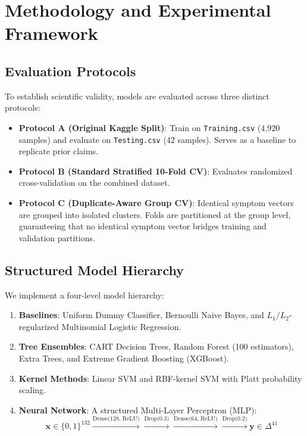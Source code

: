 \section{Methodology and Experimental Framework}
\label{sec:methodology}

\subsection{Evaluation Protocols}
To establish scientific validity, models are evaluated across three distinct protocols:
\begin{itemize}
    \item \textbf{Protocol A (Original Kaggle Split)}: Train on \texttt{Training.csv} (4,920 samples) and evaluate on \texttt{Testing.csv} (42 samples). Serves as a baseline to replicate prior claims.
    \item \textbf{Protocol B (Standard Stratified 10-Fold CV)}: Evaluates randomized cross-validation on the combined dataset.
    \item \textbf{Protocol C (Duplicate-Aware Group CV)}: Identical symptom vectors are grouped into isolated clusters. Folds are partitioned at the group level, guaranteeing that no identical symptom vector bridges training and validation partitions.
\end{itemize}

\subsection{Structured Model Hierarchy}
We implement a four-level model hierarchy:
\begin{enumerate}
    \item \textbf{Baselines}: Uniform Dummy Classifier, Bernoulli Naive Bayes, and $L_1/L_2$-regularized Multinomial Logistic Regression.
    \item \textbf{Tree Ensembles}: CART Decision Trees, Random Forest (100 estimators), Extra Trees, and Extreme Gradient Boosting (XGBoost).
    \item \textbf{Kernel Methods}: Linear SVM and RBF-kernel SVM with Platt probability scaling.
    \item \textbf{Neural Network}: A structured Multi-Layer Perceptron (MLP):
    \begin{equation}
        \mathbf{x} \in \{0, 1\}^{132} \xrightarrow{\text{Dense(128, ReLU)}} \xrightarrow{\text{Drop(0.3)}} \xrightarrow{\text{Dense(64, ReLU)}} \xrightarrow{\text{Drop(0.2)}} \mathbf{y} \in \Delta^{41}
    \end{equation}
\end{enumerate}

